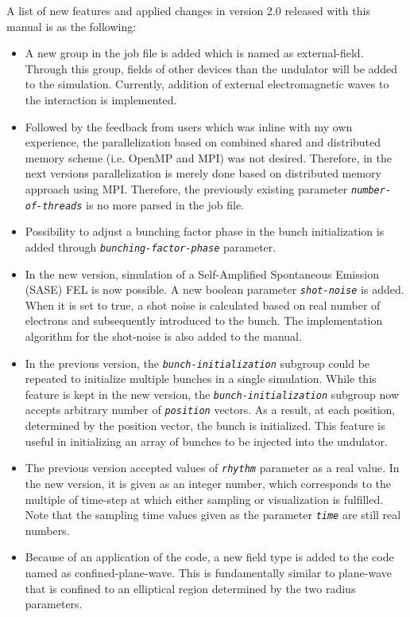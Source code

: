 A list of new features and applied changes in version 2.0 released with this manual is as the following:
%
\begin{itemize}
	\setlength{\parskip}{0pt}
	\setlength{\itemsep}{0pt plus 1pt}
	\item A new group in the job file is added which is named as external-field. Through this group, fields of other devices than the undulator will be added to the simulation. Currently, addition of external electromagnetic waves to the interaction is implemented.
	\item Followed by the feedback from users which was inline with my own experience, the parallelization based on combined shared and distributed memory scheme (i.e. OpenMP and MPI) was not desired. Therefore, in the next versions parallelization is merely done based on distributed memory approach using MPI. Therefore, the previously existing parameter {\tt \em \small number-of-threads} is no more parsed in the job file.
	\item Possibility to adjust a bunching factor phase in the bunch initialization is added through {\tt \small \em bunching-factor-phase} parameter.
	\item In the new version, simulation of a Self-Amplified Spontaneous Emission (SASE) FEL is now possible. A new boolean parameter {\tt \small \em shot-noise} is added. When it is set to true, a shot noise is calculated based on real number of electrons and subsequently introduced to the bunch. The implementation algorithm for the shot-noise is also added to the manual.
	\item In the previous version, the {\tt \small \em bunch-initialization} subgroup could be repeated to initialize multiple bunches in a single simulation. While this feature is kept in the new version, the {\tt \small \em bunch-initialization} subgroup now accepts arbitrary number of {\tt \small \em position} vectors. As a result, at each position, determined by the position vector, the bunch is initialized. This feature is useful in initializing an array of bunches to be injected into the undulator.
	\item The previous version accepted values of {\tt \em \small rhythm} parameter as a real value. In the new version, it is given as an integer number, which corresponds to the multiple of time-step at which either sampling or visualization is fulfilled. Note that the sampling time values given as the parameter {\tt \em \small time} are still real numbers.
	\item Because of an application of the code, a new field type is added to the code named as confined-plane-wave. This is fundamentally similar to plane-wave that is confined to an elliptical region determined by the two radius parameters.

\end{itemize}
